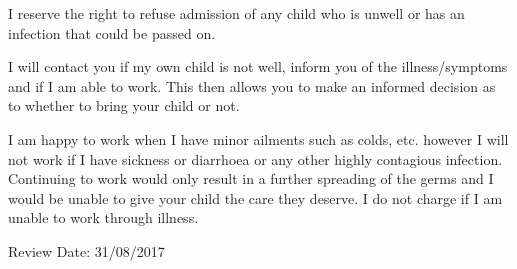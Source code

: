 I reserve the right to refuse admission of any child who is unwell or
has an infection that could be passed on.

I will contact you if my own child is not well, inform you of the
illness/symptoms and if I am able to work. This then allows you to make
an informed decision as to whether to bring your child or not.

I am happy to work when I have minor ailments such as colds, etc.
however I will not work if I have sickness or diarrhoea or any other
highly contagious infection. Continuing to work would only result in a
further spreading of the germs and I would be unable to give your child
the care they deserve. I do not charge if I am unable to work through
illness.

Review Date: 31/08/2017


